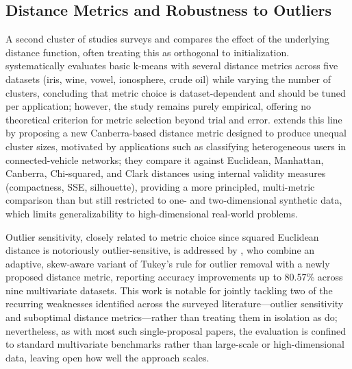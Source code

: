 \subsection{Distance Metrics and Robustness to Outliers}
A second cluster of studies surveys and compares the effect of the underlying distance function, often treating this as orthogonal to initialization. \cite{sthakare2015performance} systematically evaluates basic k-means with several distance metrics across five datasets (iris, wine, vowel, ionosphere, crude oil) while varying the number of clusters, concluding that metric choice is dataset-dependent and should be tuned per application; however, the study remains purely empirical, offering no theoretical criterion for metric selection beyond trial and error. \cite{raeisi2022distance} extends this line by proposing a new Canberra-based distance metric designed to produce unequal cluster sizes, motivated by applications such as classifying heterogeneous users in connected-vehicle networks; they compare it against Euclidean, Manhattan, Canberra, Chi-squared, and Clark distances using internal validity measures (compactness, SSE, silhouette), providing a more principled, multi-metric comparison than \cite{sthakare2015performance} but still restricted to one- and two-dimensional synthetic data, which limits generalizability to high-dimensional real-world problems.

Outlier sensitivity, closely related to metric choice since squared Euclidean distance is notoriously outlier-sensitive, is addressed by \cite{shrifan2021adaptive}, who combine an adaptive, skew-aware variant of Tukey's rule for outlier removal with a newly proposed distance metric, reporting accuracy improvements up to 80.57\% across nine multivariate datasets. This work is notable for jointly tackling two of the recurring weaknesses identified across the surveyed literature---outlier sensitivity and suboptimal distance metrics---rather than treating them in isolation as \cite{sthakare2015performance,raeisi2022distance} do; nevertheless, as with most such single-proposal papers, the evaluation is confined to standard multivariate benchmarks rather than large-scale or high-dimensional data, leaving open how well the approach scales.

